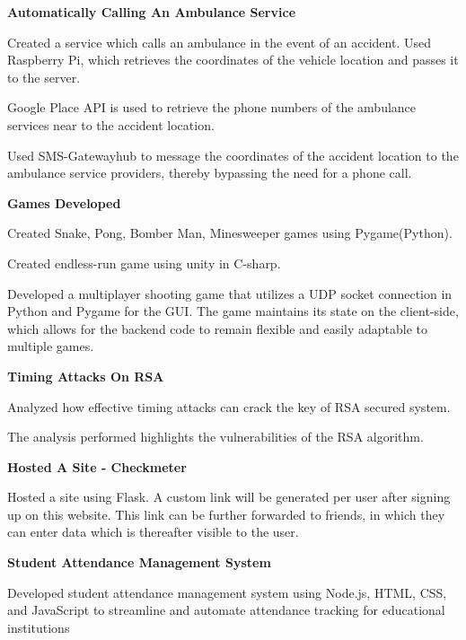 \begin{cventries}
  \cventry
    { \textbf{ Automatically Calling An Ambulance Service } }{}{}{}
    {
      \begin{cvitems}
        \item {Created a service which calls an ambulance in the event of an accident. Used Raspberry Pi, which retrieves the coordinates of the vehicle location and passes it to the server.}
        \item {Google Place API is used to retrieve the phone numbers of the ambulance services near to the accident location.}
        \item {Used SMS-Gatewayhub to message the coordinates of the accident location to the ambulance service providers, thereby bypassing the need for a phone call.}
      \end{cvitems}
    }
  \cventry
    { \textbf{Games Developed} }{}{}{}
    {
      \begin{cvitems}
        \item {Created Snake, Pong, Bomber Man, Minesweeper games using Pygame(Python).}
        \item {Created endless-run game using unity in C-sharp.}
        \item {Developed a multiplayer shooting game that utilizes a UDP socket connection in Python and Pygame for the GUI. The game maintains its state on the client-side, which allows for the backend code to remain flexible and easily adaptable to multiple games.}
      \end{cvitems}
    }
  \cventry
    {\textbf{Timing Attacks On RSA}}{}{}{}
    {
      \begin{cvitems}
        \item {Analyzed how effective timing attacks can crack the key of RSA secured system.}
        \item {The analysis performed highlights the vulnerabilities of the RSA algorithm.}
      \end{cvitems}
    }
  \cventry
    { \textbf{ Hosted A Site - Checkmeter } }{}{}{}
    {
      \begin{cvitems}
        \item {Hosted a site using Flask. A custom link will be generated per user after signing up on this website. This link can be further forwarded to friends, in which they can enter data which is thereafter visible to the user.}
      \end{cvitems}
    }
  \cventry
    { \textbf{ Student Attendance Management System } }{}{}{}
    {
      \begin{cvitems}
        \item {Developed student attendance management system using Node.js, HTML, CSS, and JavaScript to streamline and automate attendance tracking for educational institutions}
      \end{cvitems}
    }
  
\end{cventries}